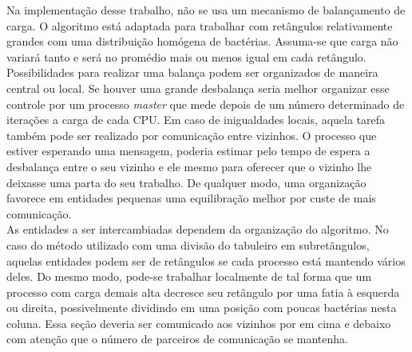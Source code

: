 Na implementação desse trabalho, não se usa um mecanismo de balançamento de carga. O algoritmo está adaptada para trabalhar com retângulos relativamente grandes com uma distribuição homógena de bactérias. Assuma-se que carga não variará tanto e será no promédio mais ou menos igual em cada retângulo.\\

Possibilidades para realizar uma balança podem ser organizados de maneira central ou local. Se houver uma grande desbalança seria melhor organizar esse controle por um processo \textit{master} que mede depois de um número determinado de iterações a carga de cada CPU. Em caso de inigualdades locais, aquela tarefa também pode ser realizado por comunicação entre vizinhos. O processo que estiver esperando uma mensagem, poderia estimar pelo tempo de espera a desbalança entre o seu vizinho e ele mesmo para oferecer que o vizinho lhe deixasse uma parta do seu trabalho. De qualquer modo,  uma organização favorece em entidades pequenas uma equilibração melhor por custe de mais comunicação.\\

As entidades a ser intercambiadas dependem da organização do algoritmo. No caso do método utilizado com uma divisão do tabuleiro em subretãngulos, aquelas entidades podem ser de retângulos se cada processo está mantendo vários deles. Do mesmo modo, pode-se trabalhar localmente de tal forma que um processo com carga demais alta decresce seu retângulo por uma fatia à esquerda ou direita, possivelmente dividindo em uma posição com poucas bactérias nesta coluna. Essa seção deveria ser comunicado aos vizinhos por em cima e debaixo com atenção que o número de parceiros de comunicação se mantenha.\\
